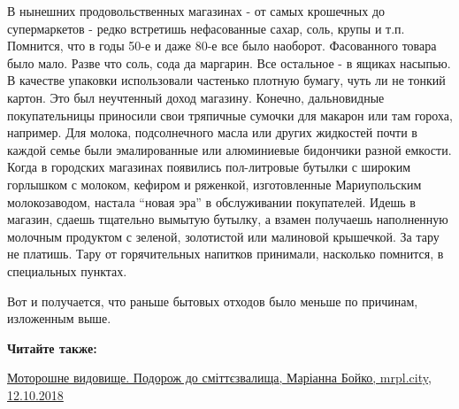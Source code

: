 В нынешних продовольственных магазинах - от самых крошечных до супермаркетов -
редко встретишь нефасованные сахар, соль, крупы и т.п. Помнится, что в годы
50-е и даже 80-е все было наоборот. Фасованного товара было мало. Разве что
соль, сода да маргарин. Все остальное - в ящиках насыпью. В качестве упаковки
использовали частенько плотную бумагу, чуть ли не тонкий картон. Это был
неучтенный доход магазину. Конечно, дальновидные покупательницы приносили свои
тряпичные сумочки для макарон или там гороха, например. Для молока,
подсолнечного масла или других жидкостей почти в каждой семье были
эмалированные или алюминиевые бидончики разной емкости. Когда в городских
магазинах появились пол-литровые бутылки с широким горлышком с молоком, кефиром
и ряженкой, изготовленные Мариупольским молокозаводом, настала \enquote{новая эра} в
обслуживании покупателей. Идешь в магазин, сдаешь тщательно вымытую бутылку, а
взамен получаешь наполненную молочным продуктом с зеленой, золотистой или
малиновой крышечкой. За тару не платишь. Тару от горячительных напитков
принимали, насколько помнится, в специальных пунктах.

Вот и получается, что раньше бытовых отходов было меньше по причинам, изложенным выше.

\textbf{Читайте также:} 

\href{https://mrpl.city/blogs/view/motoroshne-vidovishhe-podorozh-do-smittezvalishha}{%
Моторошне видовище. Подорож до сміттєзвалища, Маріанна Бойко, mrpl.city, 12.10.2018}

